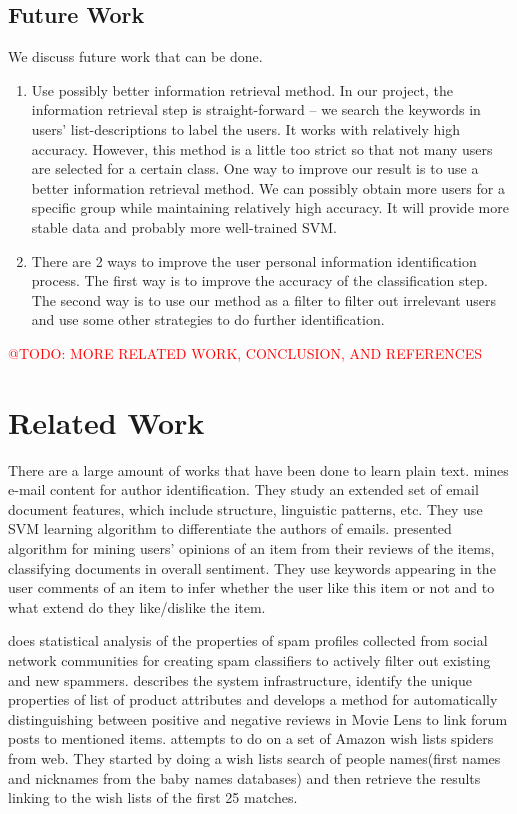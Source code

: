 \documentclass{llncs}
\makeatletter
\newcommand{\todo}[1]{\textcolor{red}{@TODO: #1}}
\makeatother
\begin{document}
\subsection{Future Work}
We discuss future work that can be done.
\begin{enumerate}
\item Use possibly better information retrieval method. In our project, the information retrieval step is straight-forward -- we search the keywords in users' list-descriptions to label the users. It works with relatively high accuracy. However, this method is a little too strict so that not many users are selected for a certain class. One way to improve our result is to use a better information retrieval method. We can possibly obtain more users for a specific group while maintaining relatively high accuracy. It will provide more stable data and probably more well-trained SVM.
\item There are 2 ways to improve the user personal information identification process. The first way is to improve the accuracy of the classification step. The second way is to use our method as a filter to filter out irrelevant users and use some other strategies to do further identification.
\end{enumerate}
\todo{MORE RELATED WORK, CONCLUSION, AND REFERENCES}
\section{Related Work}


There are a large amount of works that have been done to learn plain text. \cite{de2001mining} mines e-mail content for author identification. They study an extended set of email document features, which include structure, linguistic patterns, etc. They use SVM learning algorithm to differentiate the authors of emails. \cite{pang2002thumbs}presented algorithm for mining users' opinions of an item from their reviews of the items, classifying documents in overall sentiment. They use keywords appearing in the user comments of an item to infer whether the user like this item or not and to what extend do they like/dislike the item.

\cite{Lee:2010:USS:1835449.1835522} does statistical analysis of the properties of spam profiles collected from social network communities for creating spam classifiers to actively filter out existing and new spammers. \cite{dave2003mining} describes the system infrastructure, identify the unique properties of list of product attributes and develops a method for automatically distinguishing between positive and negative reviews in Movie Lens to link forum posts to mentioned items. \cite{kraft2007mashing}attempts to do on a set of Amazon wish lists spiders from web. They started by doing a wish lists search of people names(first names and nicknames from the baby names databases) and then retrieve the results linking to the wish lists of the first 25 matches. 
\end{document}

